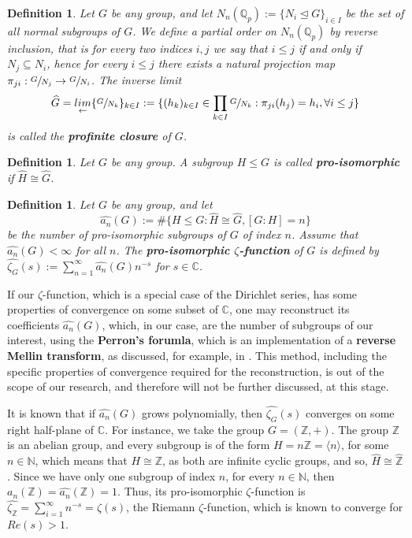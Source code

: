 \documentclass[12pt]{article}
\newtheorem{definition}[theorem]{Definition}
\begin{document}
\begin{definition}
\label{def:profinite.closure}
Let $G$ be any group, and let $N_n(\mathbb{Q}_p):=\{N_i\trianglelefteq G\}_{i\in I}$ be the set of all normal subgroups of $G$. We define a partial order on $N_n(\mathbb{Q}_p)$ by reverse inclusion, that is for every two indices $i,j$ we say that $i\leq j$ if and only if $N_j\subseteq N_i$, hence for every $i\leq j$ there exists a natural projection map $\pi_{ji}:\sfrac{G}{N_
j}\rightarrow\sfrac{G}{N_i}$. The inverse limit \[\widehat{G}=\underset{\leftarrow}{lim}\{\sfrac{G}{N_k}\}_{k\in I}:=\{(h_k)_{k\in I}\in\prod_{k\in I}\sfrac{G}{N_k} : \pi_{ji}(h_j)=h_i,\forall i\leq j\}\] is called the \textbf{profinite closure} of $G$.
\end{definition}
\begin{definition}
\label{def:pro.isomorphic}
Let $G$ be any group. A subgroup $H\leq G$ is called \textbf{pro-isomorphic} if $\widehat{H}\cong\widehat{G}$.
\end{definition}
\begin{definition}
\label{def:zeta.pro.isomorphic}
Let $G$ be any group, and let \[\hat{a_n}(G):=\#\{H\leq G : \widehat{H}\cong\widehat{G}, [G:H]=n\}\] be the number of pro-isomorphic subgroups of $G$ of index $n$. Assume that $\hat{a_n}(G)<\infty$ for all $n$. The \textbf{pro-isomorphic $\zeta$-function} of $G$ is defined by $\hat{\zeta_G}(s):=\sum_{n=1}^{\infty}\hat{a_n}(G)n^{-s}$ for $s\in\mathbb{C}$.
\end{definition}
If our $\zeta$-function, which is a special case of the Dirichlet series, has some properties of convergence on some subset of $\mathbb{C}$, one may reconstruct its coefficients $\hat{a_n}(G)$, which, in our case, are the number of subgroups of our interest, using the \textbf{Perron's forumla}, which is an implementation of a \textbf{reverse Mellin transform}, as discussed, for example, in \cite{MontgomeryVaughan}. This method, including the specific properties of convergence required for the reconstruction, is out of the scope of our research, and therefore will not be further discussed, at this stage.\par
It is known that if $\hat{a_n}(G)$ grows polynomially, then $\hat{\zeta_G}(s)$ converges on some right half-plane of $\mathbb{C}$. For instance, we take the group $G=(\mathbb{Z},+)$. The group $\mathbb{Z}$ is an abelian group, and every subgroup is of the form $H=n\mathbb{Z}=\langle n\rangle$, for some $n\in\mathbb{N}$, which means that $H\cong \mathbb{Z}$, as both are infinite cyclic groups, and so, $\widehat{H}\cong\widehat{\mathbb{Z}}$. Since we have only one subgroup of index $n$, for every $n\in\mathbb{N}$, then $a_n(\mathbb{Z})=\hat{a_n}(\mathbb{Z})=1$. Thus, its pro-isomorphic $\zeta$-function is $\hat{\zeta_{\mathbb{Z}}}=\sum_{i=1}^{\infty}n^{-s}=\zeta(s)$, the Riemann $\zeta$-function, which is known to converge for $Re(s)>1$.\par
\end{document}
